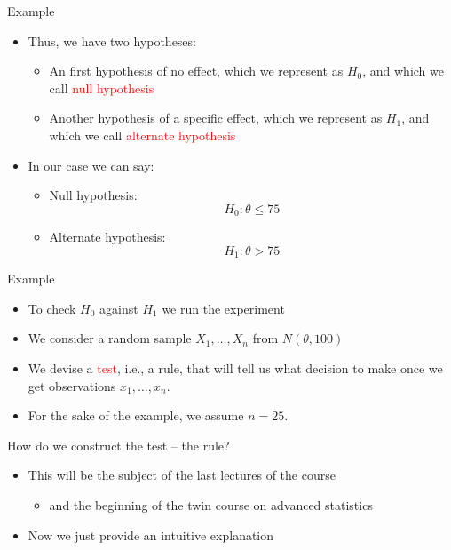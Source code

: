 \documentclass{beamer}
\begin{document}
\begin{frame}
{\centerline{Example}}



\begin{itemize}
\item Thus, we have two hypotheses:
\begin{itemize}
\item An first hypothesis of no effect, which we represent as $H_0$, and which we call \textcolor{red}{null hypothesis}
\item Another hypothesis of a specific effect, which we represent as $H_1$, and which we call \textcolor{red}{alternate hypothesis}
\end{itemize}
\item In our case we can say:
\begin{itemize}
\item Null hypothesis:
$$H_0: \theta \leq 75$$
\item Alternate hypothesis:
$$H_1: \theta > 75$$
\end{itemize}
\end{itemize}


\end{frame}


\begin{frame}
{\centerline{Example}}

\begin{itemize}
\item To check $H_0$ against $H_1$ we run the experiment 
\item We consider a random sample $X_1,\ldots, X_n$ from $N(\theta, 100)$ 
\item We devise a \textcolor{red}{test}, i.e., a rule, that will tell us what decision to make once we get observations $x_1,\ldots, x_n$.
\item For the sake of the example, we assume $n=25$.
\newline
\end{itemize}

\begin{center}
How do we construct the test -- the rule?
\end{center}

\begin{itemize}
\item This will be the subject of the last lectures of the course
\begin{itemize}
\item and the beginning of the twin course on advanced statistics
\end{itemize}
\item Now we just provide an intuitive explanation
\end{itemize}


\end{frame}
\end{document}
